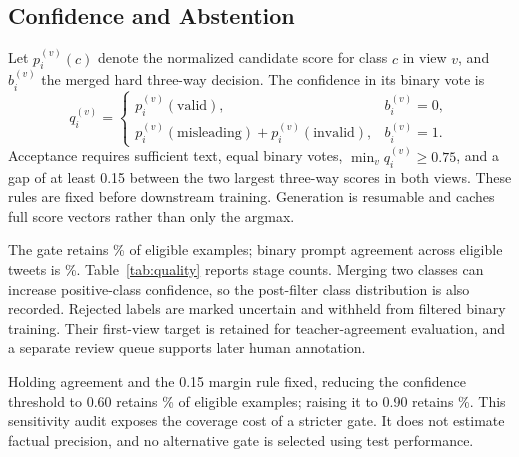 \documentclass[conference]{IEEEtran}
\begin{document}
\subsection{Confidence and Abstention}
Let $p_i^{(v)}(c)$ denote the normalized candidate score for class $c$ in view $v$, and $b_i^{(v)}$ the merged hard three-way decision. The confidence in its binary vote is
\begin{equation}
q_i^{(v)}=\begin{cases}
p_i^{(v)}(\mathrm{valid}), & b_i^{(v)}=0,\\
p_i^{(v)}(\mathrm{misleading})+p_i^{(v)}(\mathrm{invalid}), & b_i^{(v)}=1.
\end{cases}
\end{equation}
Acceptance requires sufficient text, equal binary votes, $\min_v q_i^{(v)}\geq0.75$, and a gap of at least 0.15 between the two largest three-way scores in both views. These rules are fixed before downstream training. Generation is resumable and caches full score vectors rather than only the argmax.

The gate retains \GateCoverage\% of eligible examples; binary prompt agreement across eligible tweets is \PromptAgreement\%. Table~\ref{tab:quality} reports stage counts. Merging two classes can increase positive-class confidence, so the post-filter class distribution is also recorded. Rejected labels are marked uncertain and withheld from filtered binary training. Their first-view target is retained for teacher-agreement evaluation, and a separate review queue supports later human annotation.

Holding agreement and the 0.15 margin rule fixed, reducing the confidence threshold to 0.60 retains \LooseGateCoverage\% of eligible examples; raising it to 0.90 retains \StrictGateCoverage\%. This sensitivity audit exposes the coverage cost of a stricter gate. It does not estimate factual precision, and no alternative gate is selected using test performance.


\end{document}
